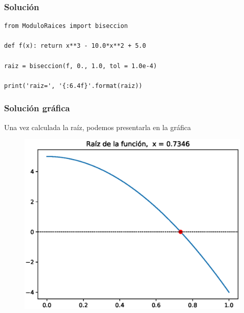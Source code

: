 \begin{frame}[fragile]
\frametitle{Solución}
\begin{lstlisting}[caption=Solución al ejercicio, style=FormattedNumber, basicstyle=\linespread{1.1}\ttfamily=\small, columns=fullflexible]
from ModuloRaices import biseccion

def f(x): return x**3 - 10.0*x**2 + 5.0

raiz = biseccion(f, 0., 1.0, tol = 1.0e-4)

print('raiz=', '{:6.4f}'.format(raiz))
\end{lstlisting}
\end{frame}
\begin{frame}[fragile]
\frametitle{Solución gráfica}
Una vez calculada la raíz, podemos presentarla en la gráfica
\begin{figure}
	\centering
	\includegraphics[scale=0.5]{Imagenes/Ejercicio_4_2_02_Libro.eps}
\end{figure}
\end{frame}

